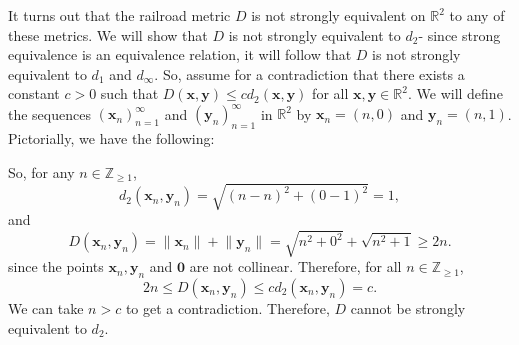 \documentclass[a4paper, openany]{memoir}
\theoremstyle{definition}
\theoremstyle{plain}
\begin{document}
It turns out that the railroad metric $D$ is not strongly equivalent on $\mathbb{R}^2$ to any of these metrics. We will show that $D$ is not strongly equivalent to $d_2$- since strong equivalence is an equivalence relation, it will follow that $D$ is not strongly equivalent to $d_1$ and $d_\infty$. So, assume for a contradiction that there exists a constant $c > 0$ such that $D(\bm{x}, \bm{y}) \leqslant cd_2(\bm{x}, \bm{y})$ for all $\bm{x}, \bm{y} \in \mathbb{R}^2$. We will define the sequences $(\bm{x}_n)_{n=1}^{\infty}$ and $(\bm{y}_n)_{n=1}^{\infty}$ in $\mathbb{R}^2$ by $\bm{x}_n = (n, 0)$ and $\bm{y}_n = (n, 1)$. Pictorially, we have the following:
\begin{figure}[H]
    \centering
\end{figure}
\noindent So, for any $n \in \mathbb{Z}_{\geqslant 1}$,
\[d_2(\bm{x}_n, \bm{y}_n) = \sqrt{(n-n)^2 + (0-1)^2} = 1,\]
and
\[D(\bm{x}_n, \bm{y}_n) = \lVert \bm{x}_n \rVert + \lVert \bm{y}_n \rVert = \sqrt{n^2 + 0^2} + \sqrt{n^2 + 1} \geqslant 2n.\]
since the points $\bm{x}_n, \bm{y}_n$ and $\bm{0}$ are not collinear. Therefore, for all $n \in \mathbb{Z}_{\geqslant 1}$,
\[2n \leqslant D(\bm{x}_n, \bm{y}_n) \leqslant cd_2(\bm{x}_n, \bm{y}_n) = c.\]
We can take $n > c$ to get a contradiction. Therefore, $D$ cannot be strongly equivalent to $d_2$.
\end{document}
